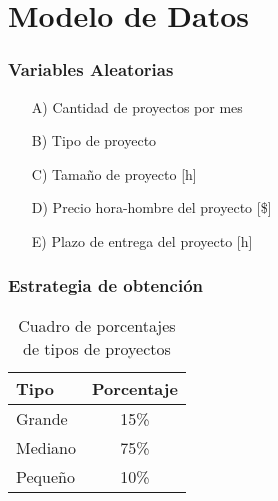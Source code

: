 \part*{Modelo de Datos}

\section{Variables Aleatorias}

\begin{itemize}
    \item[A)] Cantidad de proyectos por mes
    \item[B)] Tipo de proyecto
    \item[C)] Tamaño de proyecto [h]
    \item[D)] Precio hora-hombre del proyecto [\$]
    \item[E)] Plazo de entrega del proyecto [h]
\end{itemize}

\section{Estrategia de obtención}


\begin{table}[H]

\begin{center}

\begin{tabular}{|l|c|}
\hline
    Tipo        & Porcentaje\\
\hline
    Grande      & 15\%\\
\hline
    Mediano     & 75\%\\
\hline
    Pequeño     & 10\%\\
\hline
\end{tabular}

\end{center}

\caption{Cuadro de porcentajes de tipos de proyectos}
\label{tab:tipo-proyecto}

\end{table}

